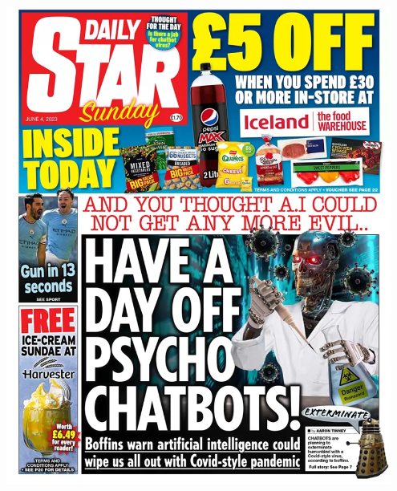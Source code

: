 \begin{frame}
\begin{columns}
\begin{column}{0.48\textwidth}
\begin{center}
    \includegraphics[width=0.95\textwidth]{./images/star_2}
    \end{center}
    \end{column}
\end{columns}

\end{frame}